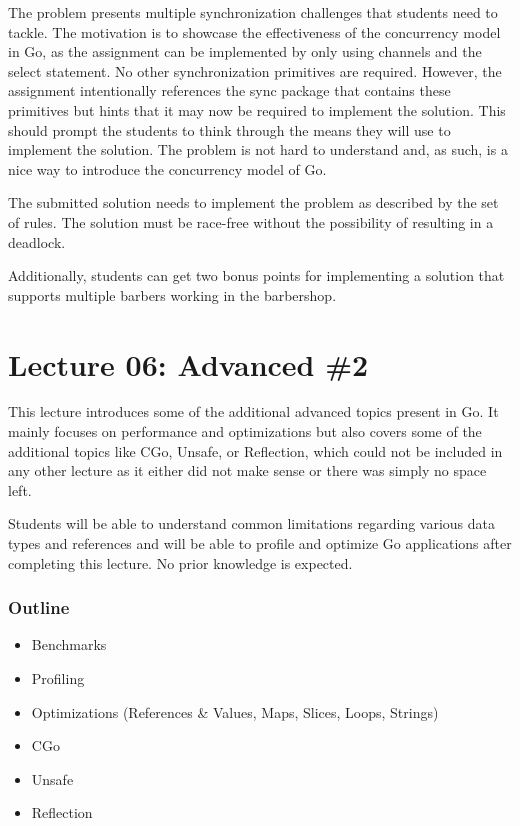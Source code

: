 \documentclass[
  digital,
  color,
  oneside,
  nosansbold,
  nocolorbold,
  nolof,
  nolot,
]{fithesis4}
\begin{document}
The problem presents multiple synchronization challenges that students need to tackle. The motivation is to showcase the effectiveness of the concurrency model in Go, as the assignment can be implemented by only using channels and the select statement. No other synchronization primitives are required. However, the assignment intentionally references the sync package\cite{go-sync} that contains these primitives but hints that it may now be required to implement the solution. This should prompt the students to think through the means they will use to implement the solution. The problem is not hard to understand and, as such, is a nice way to introduce the concurrency model of Go.
 
The submitted solution needs to implement the problem as described by the set of rules. The solution must be race-free without the possibility of resulting in a deadlock.

Additionally, students can get two bonus points for implementing a solution that supports multiple barbers working in the barbershop.

\section{Lecture 06: Advanced \#2}

This lecture introduces some of the additional advanced topics present in Go. It mainly focuses on performance and optimizations but also covers some of the additional topics like CGo, Unsafe, or Reflection, which could not be included in any other lecture as it either did not make sense or there was simply no space left.

Students will be able to understand common limitations regarding various data types and references and will be able to profile and optimize Go applications after completing this lecture. No prior knowledge is expected.

\subsubsection{Outline}

\begin{itemize}
    \item Benchmarks
    \item Profiling
    \item Optimizations (References \& Values, Maps, Slices, Loops, Strings)
    \item CGo
    \item Unsafe
    \item Reflection
\end{itemize}
\end{document}
